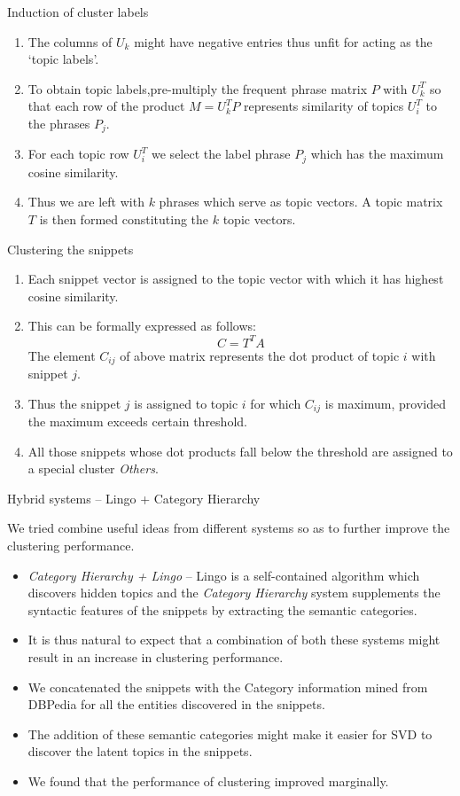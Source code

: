 \documentclass{beamer}
\begin{document}
\begin{frame}{Induction of cluster labels}
\begin{enumerate}
  \item The columns of $U_k$ might have negative entries thus unfit
    for acting as the `topic labels'. 
  \item To obtain topic labels,pre-multiply the frequent phrase
    matrix $P$ with $U_k^T$ so that each row of the product $M = U_k^T
    P$ represents similarity of topics $U_i^T$ to the phrases
    $P_j$. 
  \item For each topic row $U_i^T$ we select the label phrase $P_j$
    which has the maximum cosine similarity. 
  \item Thus we are left with $k$ phrases which serve as topic
    vectors. A topic matrix $T$ is then formed constituting the $k$
    topic vectors.
\end{enumerate}
\end{frame}

\begin{frame}{Clustering the snippets}
\begin{enumerate}
\item Each snippet vector is assigned to the topic vector with which
  it has highest cosine similarity. 
\item This can be formally expressed as follows:
$$
C = T^T A
$$
The element $C_{ij}$ of above matrix represents the dot product of
topic $i$ with snippet $j$. 
\item Thus the snippet $j$ is assigned to topic $i$ for which $C_{ij}$
  is maximum, provided the maximum exceeds certain threshold. 
\item All those snippets whose dot products fall below the threshold
  are assigned to a special cluster {\it Others}.
\end{enumerate}
\end{frame}

\begin{frame}{Hybrid systems -- Lingo + Category Hierarchy}

We tried combine useful ideas from different systems so as to further
improve the clustering performance. 
\begin{itemize}
\item {\it Category Hierarchy + Lingo} -- Lingo is a self-contained
  algorithm which discovers hidden topics and the {\it Category
    Hierarchy} system supplements the syntactic features of the
  snippets by extracting the semantic categories.
\item It is thus natural to expect that a combination of both these
  systems might result in an increase in clustering performance.
\item We concatenated the snippets with the Category information mined
  from DBPedia for all the entities discovered in the snippets. 
\item The addition of these semantic categories might make it easier
  for SVD to discover the latent topics in the snippets.
\item We found that the performance of clustering improved
  marginally.
\end{itemize}
\end{frame}
\end{document}
